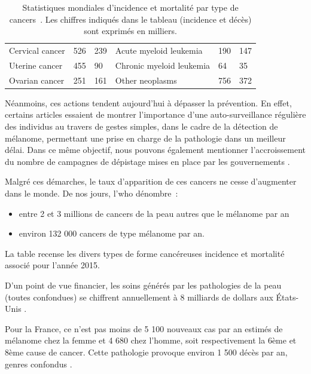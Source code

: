 \begin{table}[H]
\begin{tabular}{lll|lll}
    Cervical cancer                     & 526               & 239           &  Acute myeloid leukemia          & 190                & 147           \\
    Uterine cancer                      & 455               & 90            &  Chronic myeloid leukemia        & 64                 & 35            \\
    Ovarian cancer                      & 251               & 161           &  Other neoplasms                 & 756                & 372           \\
    \end{tabular}    
    \caption{Statistiques mondiales d’incidence et mortalité par type de cancers~\cite{Karimkhani2017}. Les chiffres indiqués dans le tableau (incidence et décès) sont exprimés en milliers.}
    \label{tab:introduction_cancer_incidence}
\end{table}\par

Néanmoins, ces actions tendent aujourd’hui à dépasser la prévention. En effet, certains articles essaient de montrer l’importance d’une auto-surveillance régulière des individus au travers de gestes simples, dans le cadre de la détection de mélanome, permettant une prise en charge de la pathologie dans un meilleur délai. Dans ce même objectif, nous pouvons également mentionner l’accroissement du nombre de campagnes de dépistage mises en place par les gouvernements \cite{Friedman1985}.\par

Malgré ces démarches, le taux d’apparition de ces cancers ne cesse d’augmenter dans le monde. De nos jours, l'\gls{who} dénombre~:
\begin{itemize}
    \item entre 2 et 3 millions de cancers de la peau autres que le mélanome par an
    \item environ 132 000 cancers de type mélanome par an.
\end{itemize} La table  recense les divers types de forme cancéreuses incidence et mortalité associé pour l'année 2015. \par

D'un point de vue financier, les soins générés par les pathologies de la peau (toutes confondues) se chiffrent annuellement à 8 milliards de dollars aux États-Unis \cite{Farberg2017a}.\par

Pour la France, ce n’est pas moins de 5 100 nouveaux cas par an estimés de mélanome chez la femme et 4 680 chez l’homme, soit respectivement la 6ème et 8ème cause de cancer. Cette pathologie provoque environ 1 500 décès par an, genres confondus \cite{Thuret2012}.\par


